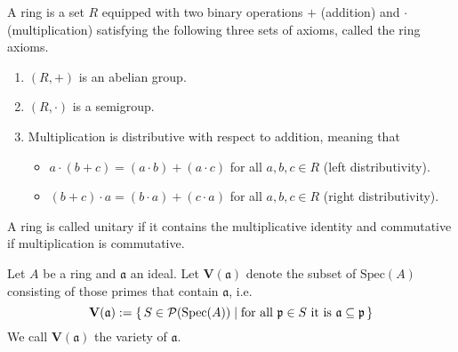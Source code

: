 \begin{defn}[Ring]
    A ring is a set \(R\) equipped with two binary operations \(+\) (addition) and \(\cdot\) (multiplication) satisfying the following three sets of axioms, called the ring axioms.
    \begin{enumerate}
      \item \((R, +)\) is an abelian group.
      \item \((R, \cdot)\) is a semigroup.
      \item Multiplication is distributive with respect to addition, meaning that
      \begin{itemize}
        \item \(a \cdot (b + c) = (a \cdot b) + (a \cdot c)\) for all \(a, b, c \in R\) (left distributivity).
        \item \((b + c) \cdot a = (b \cdot a) + (c \cdot a)\) for all \(a, b, c \in R\) (right distributivity).
      \end{itemize}
    \end{enumerate}
    A ring is called unitary if it contains the multiplicative identity and commutative if multiplication is commutative.
\end{defn}

\begin{defn}[Ideal]
    
\end{defn}

\begin{defn}
    
\end{defn}

\begin{defn}
    
\end{defn}

\begin{defn}
    
\end{defn}

\begin{defn}[Spectrum]
    
\end{defn}

\begin{defn}[Variety]
    Let \(A\) be a ring and \(\mathfrak{a}\) an ideal. Let \(\mathbf{V}(\mathfrak{a})\) denote the subset of \(\mathrm{Spec}(A)\) consisting of those primes that contain \(\mathfrak{a}\), i.e.
    \begin{equation}
        \mathbf{V}(\mathfrak{a}) := \left\{\, S \in \mathcal{P}(\mathrm{Spec}(A)) \mathrel{\mid} \text{for all \(\mathfrak{p} \in S\) it is \(\mathfrak{a} \subseteq \mathfrak{p}\)} \,\right\}
    \end{equation}
    We call \(\mathbf{V}(\mathfrak{a})\) the variety of \(\mathfrak{a}\).
\end{defn}

